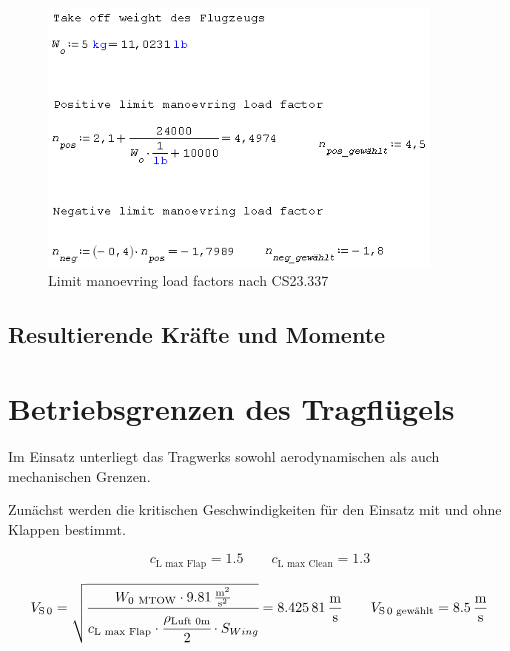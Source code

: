 \begin{figure}[H]
\centering
\includegraphics[width=0.9\textwidth]{bilder/Formeln/Kritische_Lastfaelle_Manoeverlasten.png}
\caption{Limit manoevring load factors nach CS23.337} 
\label{fig:Limit manoevring load factors nach CS23.337}
\end{figure}



\subsection{Resultierende Kräfte und Momente}
\label{Resultierende Kräfte und Momenten Kritisch}

\section{Betriebsgrenzen des Tragflügels}

Im Einsatz unterliegt das Tragwerks sowohl aerodynamischen als auch mechanischen Grenzen.

Zunächst werden die kritischen Geschwindigkeiten für den Einsatz mit und ohne Klappen bestimmt.

\begin{equation}
\label{eq:K4}
c_{\text{L\ max\ Flap}} = 1.5 \qquad c_{\text{L\ max\ Clean}} = 1.3 
\end{equation}

\begin{equation}
\label{eq:K5}
V_{\text{S\,0}} = \sqrt{\cfrac{W_{0\ \text{MTOW}} \cdot \SI[per-mode = fraction]{9,81}{\meter\squared\per\second\squared}}{c_{\text{L\ max\ Flap}} \cdot \cfrac{\rho_{\text{Luft\ 0m}}}{2} \cdot S_{Wing}}}=\SI[per-mode = fraction]{8,42581}{\meter\per\second} \qquad V_{\text{S\,0\ gewählt}}=\SI[per-mode = fraction]{8,5}{\meter\per\second}
\end{equation}

